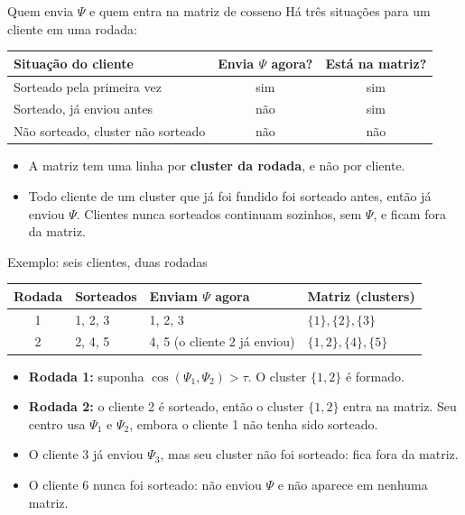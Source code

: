\documentclass[aspectratio=169]{beamer}
\begin{document}
\begin{frame}{Quem envia $\Psi$ e quem entra na matriz de cosseno}
  Há três situações para um cliente em uma rodada:

  \vspace{0.5em}
  \begin{center}
    \small
    \begin{tabular}{@{}p{4.6cm}cc@{}}
      \toprule
      Situação do cliente & Envia $\Psi$ agora? & Está na matriz? \\
      \midrule
      Sorteado pela primeira vez & sim & sim \\
      Sorteado, já enviou antes & não & sim \\
      Não sorteado, cluster não sorteado & não & não \\
      \bottomrule
    \end{tabular}
  \end{center}

  \vspace{0.3em}
  \begin{itemize}
    \item A matriz tem uma linha por \textbf{cluster da rodada}, e não por cliente.
    \item Todo cliente de um cluster que já foi fundido foi sorteado antes, então já enviou $\Psi$.
      Clientes nunca sorteados continuam sozinhos, sem $\Psi$, e ficam fora da matriz.
  \end{itemize}
\end{frame}

\begin{frame}{Exemplo: seis clientes, duas rodadas}
  \small
  \begin{tabular}{@{}clll@{}}
    \toprule
    Rodada & Sorteados & Enviam $\Psi$ agora & Matriz (clusters) \\
    \midrule
    1 & 1, 2, 3 & 1, 2, 3 & $\{1\},\{2\},\{3\}$ \\
    2 & 2, 4, 5 & 4, 5 (o cliente 2 já enviou) & $\{1,2\},\{4\},\{5\}$ \\
    \bottomrule
  \end{tabular}

  \vspace{0.6em}
  \begin{itemize}
    \item \textbf{Rodada 1:} suponha $\cos(\Psi_1,\Psi_2) > \tau$. O cluster $\{1,2\}$ é formado.
    \item \textbf{Rodada 2:} o cliente 2 é sorteado, então o cluster $\{1,2\}$ entra na matriz.
      Seu centro usa $\Psi_1$ e $\Psi_2$, embora o cliente 1 não tenha sido sorteado.
    \item O cliente 3 já enviou $\Psi_3$, mas seu cluster não foi sorteado: fica fora da matriz.
    \item O cliente 6 nunca foi sorteado: não enviou $\Psi$ e não aparece em nenhuma matriz.
  \end{itemize}
\end{frame}
\end{document}
